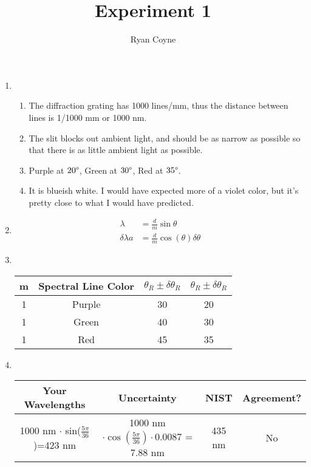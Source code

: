 \documentclass[12pt]{article}
\begin{document}
    \title{Experiment 1}
    \author{Ryan Coyne}
    \date{}
    \maketitle

    \begin{enumerate}
        \item \begin{enumerate}
            \item The diffraction grating has 1000 lines/mm, thus the distance between lines is 1/1000 mm or 1000 nm.
            \item The slit blocks out ambient light, and should be as narrow as possible so that there is as little ambient light as possible.
            \item Purple at \(20\degree\), Green at \(30\degree\), Red at \(35\degree\).
            \item It is blueish white. I would have expected more of a violet color, but it's pretty close to what I would have predicted. 
        \end{enumerate}
        \item \begin{align*}
            \lambda &= \frac{d}{m} \sin\theta\\
            \delta \lambda a&= \frac{d}{m} \cos(\theta) \delta \theta
        \end{align*}
        \item \, 
        \begin{table}[h]
            \centering
            \begin{tabular}{c|c|c|c}
                m & Spectral Line Color & \(\theta_R \pm \delta \theta_R\) & \(\theta_R \pm \delta \theta_R\)\\
                \hline
                1 & Purple & 30 & 20 \\
                1 & Green & 40 & 30 \\
                1 & Red & 45 & 35
            \end{tabular}
        \end{table}
        \item \, 
        \begin{table}[h]
            \centering
            \begin{tabular}{c|c|c|c}
                Your Wavelengths & Uncertainty & NIST & Agreement?\\
                \hline
                1000 nm \(\cdot\) sin(\(\frac{5\pi}{36}\))=423 nm & 1000 nm \(\cdot \cos(\frac{5\pi}{36})\cdot0.0087\) = 7.88 nm & 435 nm & No \\

\end{tabular}
\end{table}
\end{enumerate}
\end{document}
